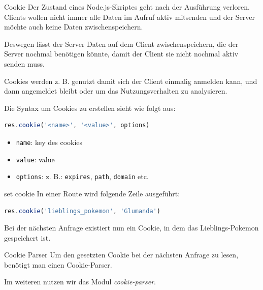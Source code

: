 \begin{defi}{Cookie}
    Der Zustand eines Node.js-Skriptes geht nach der Ausführung verloren.
    Clients wollen nicht immer alle Daten im Aufruf aktiv mitsenden und der Server möchte auch keine Daten zwischenspeichern.

    Deswegen lässt der Server Daten auf dem Client zwischenspeichern, die der Server nochmal benötigen könnte, damit der Client sie nicht nochmal aktiv senden muss.

    Cookies werden z. B. genutzt damit sich der Client einmalig anmelden kann, und dann angemeldet bleibt oder um das Nutzungsverhalten zu analysieren.

    Die Syntax um Cookies zu erstellen sieht wie folgt aus:
    \begin{lstlisting}[language=JavaScript]
        res.cookie('<name>', '<value>', options)
    \end{lstlisting}

    \begin{itemize}
        \item \texttt{name}: key des cookies
        \item \texttt{value}: value
        \item \texttt{options}: z. B.: \texttt{expires}, \texttt{path}, \texttt{domain} etc.
    \end{itemize}
\end{defi}

\begin{example}{set cookie}
    In einer Route wird folgende Zeile ausgeführt:

    \begin{lstlisting}[language=JavaScript]
        res.cookie('lieblings_pokemon', 'Glumanda')
    \end{lstlisting}

    Bei der nächsten Anfrage existiert nun ein Cookie, in dem das Lieblings-Pokemon gespeichert ist.
\end{example}

\begin{bonus}{Cookie Parser}
    Um den gesetzten Cookie bei der nächsten Anfrage zu lesen, benötigt man einen Cookie-Parser.

    Im weiteren nutzen wir das Modul \emph{cookie-parser}.
\end{bonus}

